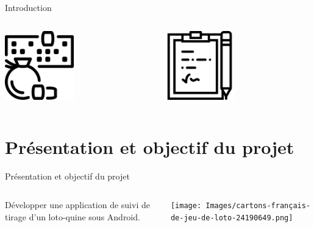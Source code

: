 \documentclass{beamer}
\begin{document}
\begin{frame}{Introduction}
    \begin{columns}[T]
     \begin{column}[c]{5cm}
        \begin{center}\includegraphics[height=3cm]{Images/loto_icon.png}
        \end{center}
     \end{column}
     \begin{column}[c]{5cm}
          \begin{center}\includegraphics[height=3cm]{Images/note_icon.png}
          \end{center}
     \end{column}
     \end{columns}
\end{frame}


\section{Présentation et objectif du projet}

\begin{frame}{Présentation et objectif du projet}
    \begin{columns}[T]
     \begin{column}[c]{5cm}
     Développer une application de suivi de tirage d'un loto-quine sous Android.
     \end{column}
     \begin{column}[c]{5cm}
          \begin{center}\texttt{[image: Images/cartons-français-de-jeu-de-loto-24190649.png]} \end{center}
     \end{column}
     \end{columns}
\end{frame}
\end{document}

